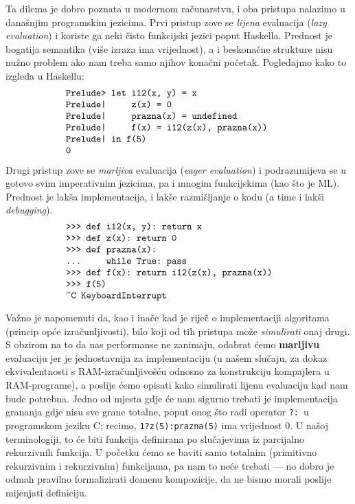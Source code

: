 Ta dilema je dobro poznata u modernom računarstvu, i oba pristupa nalazimo u današnjim programskim jezicima. Prvi pristup zove se \emph{lijena} evaluacija (\emph{lazy evaluation}) i koriste ga neki čisto funkcijski jezici poput Haskella. Prednost je bogatija semantika (više izraza ima vrijednost), a i beskonačne strukture nisu nužno problem ako nam treba samo njihov konačni početak. Pogledajmo kako to izgleda u Haskellu:
\begin{equation}\begin{minipage}{0.8\textwidth}
\begin{verbatim}
    Prelude> let i12(x, y) = x
    Prelude|     z(x) = 0
    Prelude|     prazna(x) = undefined
    Prelude|     f(x) = i12(z(x), prazna(x))
    Prelude| in f(5)
    0
\end{verbatim}
\end{minipage}\end{equation}

Drugi pristup zove se \emph{marljiva} evaluacija (\emph{eager evaluation}) i podrazumijeva se u gotovo svim imperativnim jezicima, pa i mnogim funkcijskima (kao što je ML\@). Prednost je lakša implementacija, i lakše razmišljanje o kodu (a time i lakši \emph{debugging}). %
\begin{equation}\begin{minipage}{0.8\textwidth}
\begin{verbatim}
    >>> def i12(x, y): return x
    >>> def z(x): return 0
    >>> def prazna(x):
    ...     while True: pass
    >>> def f(x): return i12(z(x), prazna(x))
    >>> f(5)
    ^C KeyboardInterrupt
\end{verbatim}
\end{minipage}\end{equation}

Važno je napomenuti da, kao i inače kad je riječ o implementaciji algoritama (princip opće izračunljivosti), bilo koji od tih pristupa može \emph{simulirati} onaj drugi. S obzirom na to da nas performanse ne zanimaju, odabrat ćemo \textbf{marljivu} evaluaciju jer je jednostavnija za implementaciju (u našem slučaju, za dokaz ekvivalentnosti s RAM-izračunljivošću odnosno za konstrukciju kompajlera u RAM-programe), a poslije ćemo opisati kako simulirati lijenu evaluaciju kad nam bude potrebna. Jedno od mjesta gdje će nam sigurno trebati je implementacija grananja gdje nisu sve grane totalne, poput onog što radi operator \texttt{?:}\ u programskom jeziku C; recimo, \texttt{1?z(5):prazna(5)} ima vrijednost $0$. U našoj terminologiji, to će biti funkcija definirana po slučajevima iz parcijalno rekurzivnih funkcija. U početku ćemo se baviti samo totalnim (primitivno rekurzivnim i rekurzivnim) funkcijama, pa nam to neće trebati --- no dobro je odmah pravilno formalizirati domenu kompozicije, da ne bismo morali poslije mijenjati definiciju.

